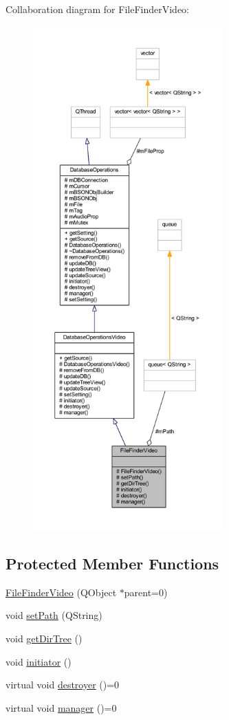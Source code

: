 Collaboration diagram for File\-Finder\-Video\-:
\nopagebreak
\begin{figure}[H]
\begin{center}
\leavevmode
\includegraphics[height=550pt]{class_file_finder_video__coll__graph}
\end{center}
\end{figure}
\subsection*{Protected Member Functions}
\begin{DoxyCompactItemize}
\item 
\hyperlink{class_file_finder_video_a090fd7eb7d99d7f018523c87548d6b8e}{File\-Finder\-Video} (Q\-Object $\ast$parent=0)
\item 
void \hyperlink{class_file_finder_video_aa0711fca668fcc1e06b603d330f4bf8c}{set\-Path} (Q\-String)
\item 
void \hyperlink{class_file_finder_video_a9865b680e146d66acf9616f8f5f70db6}{get\-Dir\-Tree} ()
\item 
void \hyperlink{class_file_finder_video_ad792218f1dafd62852f7d25bc3b80a50}{initiator} ()
\item 
virtual void \hyperlink{class_file_finder_video_a37f0b885d2e98d3ac8b6f845c874c63d}{destroyer} ()=0
\item 
virtual void \hyperlink{class_file_finder_video_aafe5126b440c0c5564a32a54fee0781c}{manager} ()=0
\end{DoxyCompactItemize}
